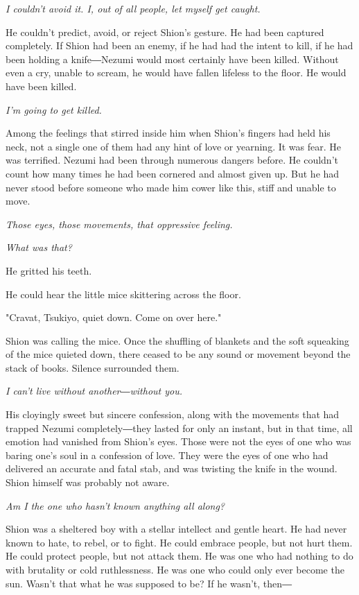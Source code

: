 \emph{I couldn't avoid it. I, out of all people, let myself get caught.}

He couldn't predict, avoid, or reject Shion's gesture. He had been
captured completely. If Shion had been an enemy, if he had had the
intent to kill, if he had been holding a knife―Nezumi would most
certainly have been killed. Without even a cry, unable to scream, he
would have fallen lifeless to the floor. He would have been killed.

\emph{I'm going to get killed.}

Among the feelings that stirred inside him when Shion's fingers had held
his neck, not a single one of them had any hint of love or yearning. It
was fear. He was terrified. Nezumi had been through numerous dangers
before. He couldn't count how many times he had been cornered and almost
given up. But he had never stood before someone who made him cower like
this, stiff and unable to move.

\emph{Those eyes, those movements, that oppressive feeling.}

\emph{What was that?}

He gritted his teeth.

He could hear the little mice skittering across the floor.

"Cravat, Tsukiyo, quiet down. Come on over here."

Shion was calling the mice. Once the shuffling of blankets and the soft
squeaking of the mice quieted down, there ceased to be any sound or
movement beyond the stack of books. Silence surrounded them.

\emph{I can't live without another―without you.}

His cloyingly sweet but sincere confession, along with the movements
that had trapped Nezumi completely―they lasted for only an instant, but
in that time, all emotion had vanished from Shion's eyes. Those were not
the eyes of one who was baring one's soul in a confession of love. They
were the eyes of one who had delivered an accurate and fatal stab, and
was twisting the knife in the wound. Shion himself was probably not
aware.

\emph{Am I the one who hasn't known anything all along?}

Shion was a sheltered boy with a stellar intellect and gentle heart. He
had never known to hate, to rebel, or to fight. He could embrace people,
but not hurt them. He could protect people, but not attack them. He was
one who had nothing to do with brutality or cold ruthlessness. He was
one who could only ever become the sun. Wasn't that what he was supposed
to be? If he wasn't, then―

